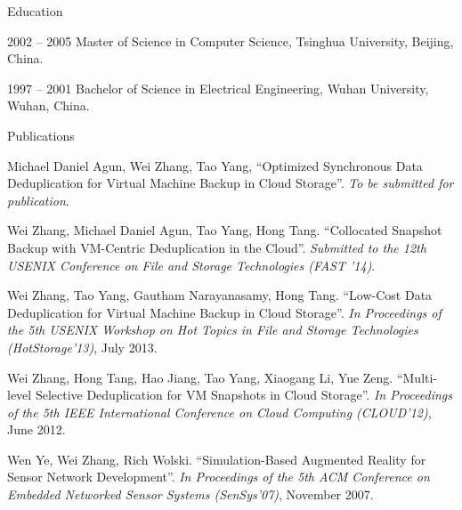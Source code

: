 \begin{vitae}
{\small

\begin{vitaesection}{Education}
\vspace{-0.1cm}
   \item [2002 -- 2005] Master of Science in Computer Science, Tsinghua University, Beijing, China.
    
   \item [1997 -- 2001] Bachelor of Science in Electrical Engineering, Wuhan University, Wuhan, China.

\end{vitaesection}



\begin{vitaesection}{Publications}
\item Michael Daniel Agun, Wei Zhang, Tao Yang, ``Optimized Synchronous Data Deduplication for Virtual Machine Backup in Cloud Storage''. {\it To be submitted for publication}.

\item Wei Zhang, Michael Daniel Agun, Tao Yang, Hong Tang. ``Collocated Snapshot Backup with VM-Centric Deduplication in the Cloud''. {\it Submitted to the 12th USENIX Conference on File and Storage Technologies (FAST '14)}.

\item Wei Zhang, Tao Yang, Gautham Narayanasamy, Hong Tang. ``Low-Cost Data Deduplication for Virtual Machine Backup in Cloud Storage''. {\it In Proceedings of the 5th USENIX Workshop on Hot Topics in File and Storage Technologies (HotStorage'13)}, July 2013.

\item Wei Zhang, Hong Tang, Hao Jiang, Tao Yang, Xiaogang Li, Yue Zeng. ``Multi-level Selective Deduplication for VM Snapshots in Cloud Storage''. {\it In Proceedings of the 5th IEEE International Conference on Cloud Computing (CLOUD'12)}, June 2012.

\item Wen Ye, Wei Zhang, Rich Wolski. ``Simulation-Based Augmented Reality for Sensor Network Development''. {\it In Proceedings of the 5th ACM Conference on Embedded Networked Sensor Systems (SenSys'07)}, November 2007.


\end{vitaesection}}
\end{vitae}

